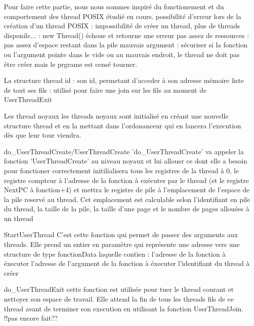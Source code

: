 Pour faire cette partie, nous nous sommes inspiré du fonctionement et du comportement des thread POSIX étudié en cours.
possibilité d'erreur lors de la création d'un thread POSIX :
	impossibilité de créer un thread, plus de threads disponile... : new Thread() échoue et retourne une erreur
	pas assez de ressources : pas assez d'espace restant dans la pile
	mauvais argument : sécuriser si la fonction ou l'argument pointe dans le vide ou au mauvais endroit, le thread ne doit pas être créer mais le prgrame est censé tourner.

La structure thread
	id : son id, permetant d'acceder à son adresse mémoire
	liste de tout ses fils : utilisé pour faire une join sur les fils au moment de UserThreadExit

Les thread noyaux
les threads noyaux sont initialisé en créant une nouvelle structure thread et en la mettant dans l'ordonanceur qui en lancera l'execution dès que leur tour viendra.

do_UserThreadCreate/UserThreadCreate
	'do_UserThreadCreate' va appeler la fonction 'UserThreadCreate' au niveau noyaux et lui allouer ce dont elle a besoin pour fonctioner correctement
	initilialisera tous les registres de la thread à 0, le registre compteur à l'adresse de la fonction à exécuter par le thread (et le registre NextPC à fonction+4) et mettra le registre de pile à l'emplacement de l'espace de la pile reservé au thread. Cet emplacement est calculable selon l'identifiant en pile du thread, la taille de la pile, la taille d'une page et le nombre de pages allouées à un thread

StartUserThread
	C'est cette fonction qui permet de passer des arguments aux threads. Elle prend un entier en paramètre qui représente une adresse vers une structure de type fonctionData laquelle contien :
		l'adresse de la fonction à éxecuter
		l'adresse de l'argument de la fonction à éxecuter
		l'identifiant du thread à créer

do_UserThreadExit
	cette fonction est utilisée pour tuer le thread courant et nettoyer son espace de travail. Elle attend la fin de tous les threads fils de ce thread avant de terminer son execution en utilisant la fonction UserThreadJoin.
		!!pas encore fait??

